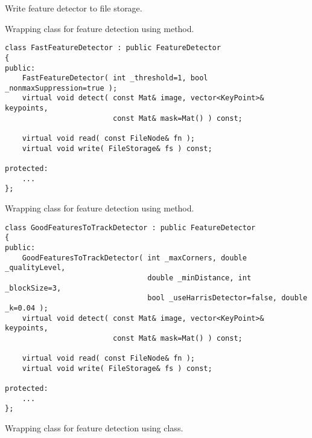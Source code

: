 
\begin{description}
\end{description}

Write feature detector to file storage.


\begin{description}
\end{description}

Wrapping class for feature detection using  method.

\begin{lstlisting}
class FastFeatureDetector : public FeatureDetector
{
public:
    FastFeatureDetector( int _threshold=1, bool _nonmaxSuppression=true );
    virtual void detect( const Mat& image, vector<KeyPoint>& keypoints, 
                         const Mat& mask=Mat() ) const;

    virtual void read( const FileNode& fn );
    virtual void write( FileStorage& fs ) const;

protected:
    ...
};
\end{lstlisting}

Wrapping class for feature detection using  method.

\begin{lstlisting}
class GoodFeaturesToTrackDetector : public FeatureDetector
{
public:
    GoodFeaturesToTrackDetector( int _maxCorners, double _qualityLevel, 
                                 double _minDistance, int _blockSize=3, 
                                 bool _useHarrisDetector=false, double _k=0.04 );
    virtual void detect( const Mat& image, vector<KeyPoint>& keypoints, 
                         const Mat& mask=Mat() ) const;

    virtual void read( const FileNode& fn );
    virtual void write( FileStorage& fs ) const;

protected:
    ...
};
\end{lstlisting}

Wrapping class for feature detection using  class.

